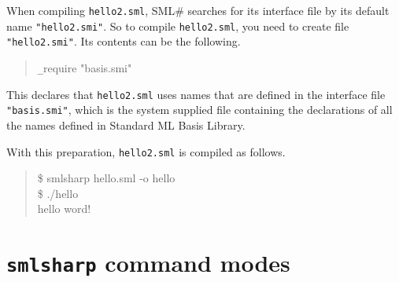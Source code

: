 \documentclass{jbook}
\newcommand{\txt}[2]{#2}
\newcommand{\smlsharp}{SML\#}
\newenvironment{program}{\begin{tt}\begin{quote}}{\end{quote}\end{tt}}
\begin{document}
	When compiling {\tt hello2.sml}, \smlsharp{} searches for 
its interface file by its default name {\tt "hello2.smi"}.
	So to compile {\tt hello2.sml}, you need to create file {\tt
"hello2.smi"}.
	Its contents can be the following.
\begin{program}
\verb|_|require "basis.smi"
\end{program}
	This declares that {\tt hello2.sml} uses names that are defined
in the interface file {\tt "basis.smi"}, which is the system supplied
file containing the declarations of all the names defined in Standard ML
Basis Library.

	With this preparation, {\tt hello2.sml} is compiled as follows.
\begin{program}
\$ smlsharp hello.sml -o hello\\
\$ ./hello\\
hello word!\\
\end{program}
\fi%

\section{
\txt{{\tt smlsharp}コマンドの起動モード}
{{\tt smlsharp} command modes}}
\label{sec:tutorialSmlsharpParameter}
\end{document}
